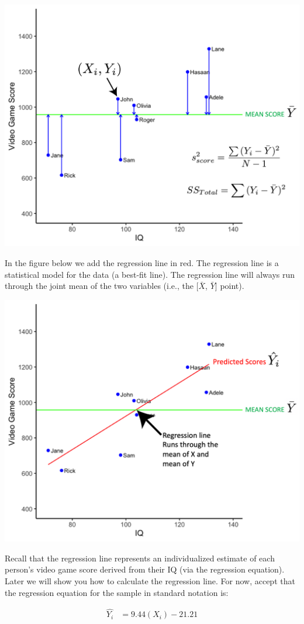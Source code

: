 \documentclass[
]{krantz}
\begin{document}
\includegraphics[width=0.8\linewidth]{ch_correlation/images/sample_plot2}

In the figure below we add the regression line in red. The regression line is a statistical model for the data (a best-fit line). The regression line will always run through the joint mean of the two variables (i.e., the {[}\(\bar{X}\), \(\bar{Y}\){]} point).

\includegraphics[width=0.8\linewidth]{ch_correlation/images/sample_plot3}

Recall that the regression line represents an individualized estimate of each person's video game score derived from their IQ (via the regression equation). Later we will show you how to calculate the regression line. For now, accept that the regression equation for the sample in standard notation is:

\[
\begin{aligned}
\hat{Y_i} &= 9.44(X_i) -21.21 \\
\end{aligned}
\]
\end{document}
